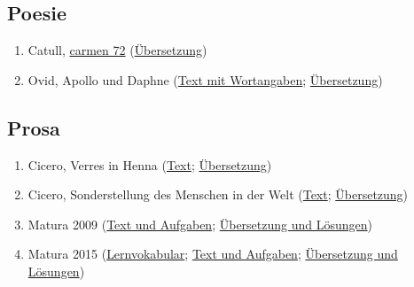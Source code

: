 \documentclass{scrartcl}
\begin{document}
\subsection{Poesie}
\label{sec:org8582688}
\begin{enumerate}
\item Catull, \href{https://www.dropbox.com/s/kc2coqw11nfxyj1/Catull72.pdf?dl=0}{carmen 72} (\href{http://www.gottwein.de/Lat/catull/catull072.php}{Übersetzung})
\item Ovid, Apollo und Daphne (\href{https://www.dropbox.com/s/g60dha8uuh5h0po/OVIDApolloDaphne.pdf?dl=0}{Text mit Wortangaben}; \href{https://www.dropbox.com/s/366v4v48njyzebm/\%25C3\%259CApollDaphne.pdf?dl=0}{Übersetzung})
\end{enumerate}

\subsection{Prosa}
\label{sec:orgc1a4891}
\begin{enumerate}
\item Cicero, Verres in Henna (\href{https://www.dropbox.com/s/gqrgxo7yjxglmdv/Matura\_LatInt\_schriftlich\_2016.pdf?dl=0}{Text}; \href{https://www.dropbox.com/s/h6y42hky2w0o2x9/\%25C3\%259Cbersetzung.pdf?dl=0}{Übersetzung})
\item Cicero, Sonderstellung des Menschen in der Welt (\href{https://www.dropbox.com/s/22oxzqeor9vqb67/LatIntSchriftlMatura2009.pdf?dl=0}{Text}; \href{https://www.dropbox.com/s/ieihesw9h0rkejd/\%25C3\%259CbersetzungMaturaLatIntensiv2009.pdf?dl=0}{Übersetzung})
\item Matura 2009 (\href{https://www.dropbox.com/s/fnt9bzwl6hklwv6/SPFSchriftlich2009.pdf?dl=0}{Text und Aufgaben}; \href{https://www.dropbox.com/s/hh89pcj1sy28kby/KorrekturSchriftlMaturaSPF2009.pdf?dl=0}{Übersetzung und Lösungen})
\item Matura 2015 (\href{https://www.dropbox.com/s/hl878959yooat32/Voki.pdf?dl=0}{Lernvokabular}; \href{https://www.dropbox.com/s/8qaeceb1qyemfwz/KSS\_Matura2015\_final.pdf?dl=0}{Text und Aufgaben}; \href{https://www.dropbox.com/s/xwvzrif0nu15j8h/Korrketur\_SPF\_Latein\_2015.pdf?dl=0}{Übersetzung und
Lösungen})
\end{enumerate}
\end{document}
